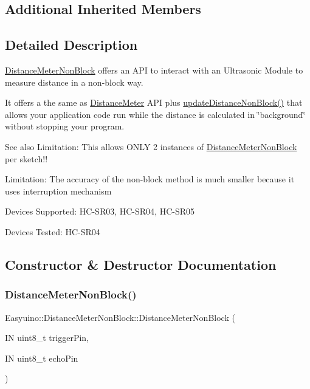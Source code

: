 \subsection*{Additional Inherited Members}


\subsection{Detailed Description}
\hyperlink{class_easyuino_1_1_distance_meter_non_block}{Distance\+Meter\+Non\+Block} offers an A\+PI to interact with an Ultrasonic Module to measure distance in a non-\/block way. 

It offers a the same as \hyperlink{class_easyuino_1_1_distance_meter}{Distance\+Meter} A\+PI plus \hyperlink{class_easyuino_1_1_distance_meter_non_block_ac7163baab744f1393bab3841de0170d4}{update\+Distance\+Non\+Block()} that allows your application code run while the distance is calculated in \char`\"{}background\char`\"{} without stopping your program. \begin{DoxySeeAlso}{See also}
Limitation\+: This allows O\+N\+LY 2 instances of \hyperlink{class_easyuino_1_1_distance_meter_non_block}{Distance\+Meter\+Non\+Block} per sketch!! 

Limitation\+: The accuracy of the non-\/block method is much smaller because it uses interruption mechanism 

Devices Supported\+: H\+C-\/\+S\+R03, H\+C-\/\+S\+R04, H\+C-\/\+S\+R05 

Devices Tested\+: H\+C-\/\+S\+R04 
\end{DoxySeeAlso}


\subsection{Constructor \& Destructor Documentation}
\mbox{\label{class_easyuino_1_1_distance_meter_non_block_ad7e7b63fc4655957eb00f24d82512d2a}} 
\subsubsection{\texorpdfstring{Distance\+Meter\+Non\+Block()}{DistanceMeterNonBlock()}\hspace{0.1cm}{\footnotesize\ttfamily [1/2]}}
{\footnotesize\ttfamily Easyuino\+::\+Distance\+Meter\+Non\+Block\+::\+Distance\+Meter\+Non\+Block (\begin{DoxyParamCaption}\item[{IN uint8\+\_\+t}]{trigger\+Pin,  }\item[{IN uint8\+\_\+t}]{echo\+Pin }\end{DoxyParamCaption})}



